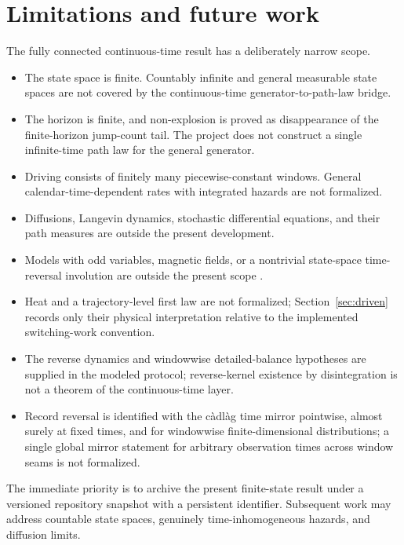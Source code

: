 \section{Limitations and future work}
\label{sec:limitations}

The fully connected continuous-time result has a deliberately narrow scope.

\begin{itemize}[leftmargin=*]
  \item The state space is finite. Countably infinite and general measurable state spaces are not covered by the continuous-time generator-to-path-law bridge.
  \item The horizon is finite, and non-explosion is proved as disappearance of the finite-horizon jump-count tail. The project does not construct a single infinite-time path law for the general generator.
  \item Driving consists of finitely many piecewise-constant windows. General calendar-time-dependent rates with integrated hazards are not formalized.
  \item Diffusions, Langevin dynamics, stochastic differential equations, and their path measures are outside the present development.
  \item Models with odd variables, magnetic fields, or a nontrivial state-space time-reversal involution are outside the present scope \parencite{SpinneyFord2012}.
  \item Heat and a trajectory-level first law are not formalized; Section~\ref{sec:driven} records only their physical interpretation relative to the implemented switching-work convention.
  \item The reverse dynamics and windowwise detailed-balance hypotheses are supplied in the modeled protocol; reverse-kernel existence by disintegration is not a theorem of the continuous-time layer.
  \item Record reversal is identified with the c\`adl\`ag time mirror pointwise, almost surely at fixed times, and for windowwise finite-dimensional distributions; a single global mirror statement for arbitrary observation times across window seams is not formalized.
\end{itemize}

The immediate priority is to archive the present finite-state result under a versioned repository snapshot with a persistent identifier. Subsequent work may address countable state spaces, genuinely time-inhomogeneous hazards, and diffusion limits.
